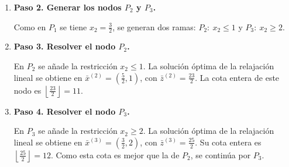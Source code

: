 \begin{enumerate}[label=\alph*)]
\begin{enumerate}
Se resuelve la relajación lineal del problema original. La solución óptima de la relajación se obtiene en la intersección de las dos restricciones originales, es decir, en $\bar{x}^{(1)}=\left(\frac{9}{4},\frac{3}{2}\right)$, con $\bar{z}^{(1)}=\frac{51}{4}$. Como la solución no es entera, se ramifica sobre $x_2$.

\begin{center}
\end{center}

\item \textbf{Paso 2. Generar los nodos $P_2$ y $P_3$.}

Como en $P_1$ se tiene $x_2=\frac{3}{2}$, se generan dos ramas: $P_2:\ x_2\leq 1$ y $P_3:\ x_2\geq 2$.

\item \textbf{Paso 3. Resolver el nodo $P_2$.}

En $P_2$ se añade la restricción $x_2\leq 1$. La solución óptima de la relajación lineal se obtiene en $\bar{x}^{(2)}=\left(\frac{5}{2},1\right)$, con $\bar{z}^{(2)}=\frac{23}{2}$. La cota entera de este nodo es $\left\lfloor\frac{23}{2}\right\rfloor=11$.

\begin{center}
\end{center}

\item \textbf{Paso 4. Resolver el nodo $P_3$.}

En $P_3$ se añade la restricción $x_2\geq 2$. La solución óptima de la relajación lineal se obtiene en $\bar{x}^{(3)}=\left(\frac{3}{2},2\right)$, con $\bar{z}^{(3)}=\frac{25}{2}$. Su cota entera es $\left\lfloor\frac{25}{2}\right\rfloor=12$. Como esta cota es mejor que la de $P_2$, se continúa por $P_3$.


\end{enumerate}
\end{enumerate}
